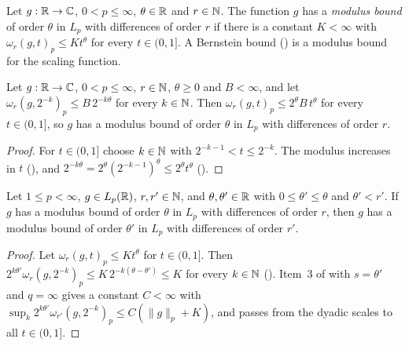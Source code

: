 \begin{definition}
\label{def:daub-modulus-bound}
\leanok
{}
Let $g : \mathbb{R} \to \mathbb{C}$, $0 < p \leq \infty$, $\theta \in \mathbb{R}$ and $r \in \mathbb{N}$. The function $g$ has a
\emph{modulus bound} of order $\theta$ in $L_p$ with differences of order $r$ if there is a
constant $K < \infty$ with $\omega_r(g, t)_p \leq K t^\theta$ for every $t \in (0, 1]$. A
Bernstein bound () is a modulus bound for the scaling function.
\end{definition}

\begin{lemma}
\label{lem:daub-modulus-bound-dyadic}
\leanok
{}
Let $g : \mathbb{R} \to \mathbb{C}$, $0 < p \leq \infty$, $r \in \mathbb{N}$, $\theta \geq 0$ and $B < \infty$, and let
$\omega_r(g, 2^{-k})_p \leq B \, 2^{-k\theta}$ for every $k \in \mathbb{N}$. Then
$\omega_r(g, t)_p \leq 2^\theta B \, t^\theta$ for every $t \in (0, 1]$, so $g$ has a modulus
bound of order $\theta$ in $L_p$ with differences of order $r$.
\end{lemma}

\begin{proof}
\leanok
{}
For $t \in (0, 1]$ choose $k \in \mathbb{N}$ with $2^{-k-1} < t \leq 2^{-k}$. The modulus increases in
$t$ (), and
$2^{-k\theta} = 2^\theta (2^{-k-1})^\theta \leq 2^\theta t^\theta$
().
\end{proof}

\begin{lemma}
\label{lem:daub-modulus-bound-orders}
\leanok
{}
Let $1 \leq p < \infty$, $g \in L_p(\mathbb{R})$, $r, r' \in \mathbb{N}$, and $\theta, \theta' \in \mathbb{R}$ with
$0 \leq \theta' \leq \theta$ and $\theta' < r'$. If $g$ has a modulus bound of order $\theta$ in
$L_p$ with differences of order $r$, then $g$ has a modulus bound of order $\theta'$ in $L_p$
with differences of order $r'$.
\end{lemma}

\begin{proof}
\leanok
{}
Let $\omega_r(g, t)_p \leq K t^\theta$ for $t \in (0, 1]$. Then
$2^{k\theta'} \omega_r(g, 2^{-k})_p \leq K \, 2^{-k(\theta - \theta')} \leq K$ for every
$k \in \mathbb{N}$ (). Item~3 of  with $s = \theta'$
and $q = \infty$ gives a constant $C < \infty$ with
$\sup_k 2^{k\theta'} \omega_{r'}(g, 2^{-k})_p \leq C (\|g\|_p + K)$, and
 passes from the dyadic scales to all $t \in (0, 1]$.
\end{proof}


